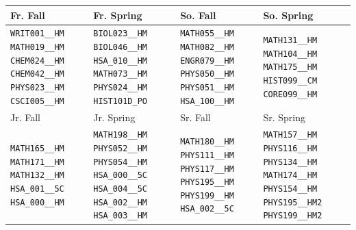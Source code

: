 \begin{tabular}{|p{}|p{}|p{}|p{}|}
    \hline
    Fr. Fall & Fr. Spring & So. Fall & So. Spring\\\hline
    \verb|WRIT001__HM| \verb|MATH019__HM| \verb|CHEM024__HM| \verb|CHEM042__HM| \verb|PHYS023__HM| \verb|CSCI005__HM|&
    \verb|BIOL023__HM| \verb|BIOL046__HM| \verb|HSA_010__HM| \verb|MATH073__HM| \verb|PHYS024__HM| \verb|HIST101D_PO|&
    \verb|MATH055__HM| \verb|MATH082__HM| \verb|ENGR079__HM| \verb|PHYS050__HM| \verb|PHYS051__HM| \verb|HSA_100__HM|&
    \verb|MATH131__HM| \verb|MATH104__HM| \verb|MATH175__HM| \verb|HIST099__CM| \verb|CORE099__HM|\\
    \hline
    Jr. Fall & Jr. Spring & Sr. Fall & Sr. Spring\\\hline
    \verb|MATH165__HM| \verb|MATH171__HM| \verb|MATH132__HM| \verb|HSA_001__5C| \verb|HSA_000__HM|&
    \verb|MATH198__HM| \verb|PHYS052__HM| \verb|PHYS054__HM| \verb|HSA_000__5C| \verb|HSA_004__5C| \verb|HSA_002__HM| \verb|HSA_003__HM|&
    \verb|MATH180__HM| \verb|PHYS111__HM| \verb|PHYS117__HM| \verb|PHYS195__HM| \verb|PHYS199__HM| \verb|HSA_002__5C|&
    \verb|MATH157__HM| \verb|PHYS116__HM| \verb|PHYS134__HM| \verb|MATH174__HM| \verb|PHYS154__HM| \verb|PHYS195__HM2| \verb|PHYS199__HM2|\\
    \hline
\end{tabular}
